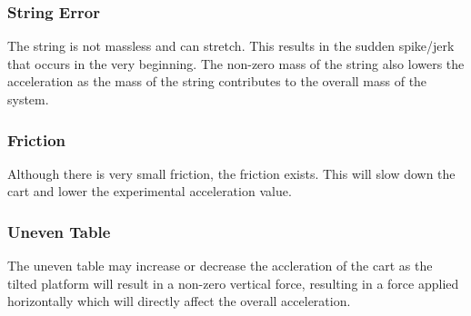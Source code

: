 \documentclass[12pt]{article}
\begin{document}
\subsubsection{String Error}
The string is not massless and can stretch. This results in the sudden spike/jerk that occurs in the very beginning. The non-zero mass of the string also lowers the acceleration as the mass of the string contributes to the overall mass of the system.

\subsubsection{Friction}
Although there is very small friction, the friction exists. This will slow down the cart and lower the experimental acceleration value.

\subsubsection{Uneven Table}
The uneven table may increase or decrease the accleration of the cart as the tilted platform will result in a non-zero vertical force, resulting in a force applied horizontally which will directly affect the overall acceleration.
\end{document}
